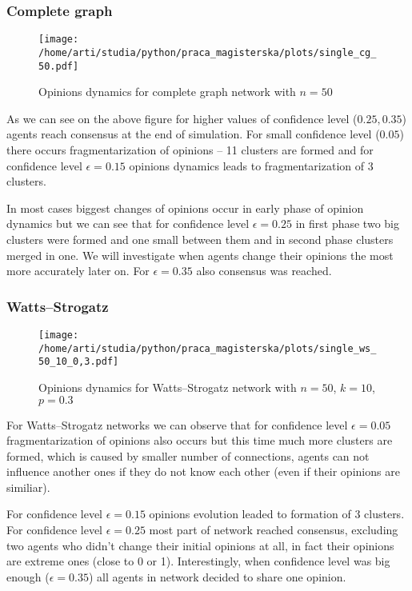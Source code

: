 \documentclass{article}
\begin{document}
\subsubsection{Complete graph}

\begin{figure}[H]
		\centering
		\texttt{[image: /home/arti/studia/python/praca\_magisterska/plots/single\_cg\_50.pdf]}
		\caption{Opinions dynamics for complete graph network with $n=50$}
\end{figure}
As we can see on the above figure for higher values of confidence level ($0.25, 0.35$) agents reach consensus at the end of simulation. For small confidence level ($0.05$) there occurs fragmentarization of opinions -- 11 clusters are formed and for confidence level $\epsilon=0.15$ opinions dynamics leads to fragmentarization of 3 clusters.
\indent

In most cases biggest changes of opinions occur in early phase of opinion dynamics but we can see that for confidence level $\epsilon=0.25$ in first phase two big clusters were formed and one small between them and in second phase clusters merged in one. We will investigate when agents change their opinions the most more accurately later on. For $\epsilon=0.35$ also consensus was reached.

\subsubsection{Watts--Strogatz}

\begin{figure}[H]
		\centering
		\texttt{[image: /home/arti/studia/python/praca\_magisterska/plots/single\_ws\_50\_10\_0,3.pdf]}
		\caption{Opinions dynamics for Watts--Strogatz network with $n=50$, $k=10$, $p=0.3$}
\end{figure}
For Watts--Strogatz networks we can observe that for confidence level $\epsilon=0.05$ fragmentarization of opinions also occurs but this time much more clusters are formed, which is caused by smaller number of connections, agents can not influence another ones if they do not know each other (even if their opinions are similiar). 
\indent

For confidence level $\epsilon=0.15$ opinions evolution leaded to formation of 3 clusters. For confidence level $\epsilon=0.25$ most part of network reached consensus, excluding two agents who didn't change their initial opinions at all, in fact their opinions are extreme ones (close to 0 or 1). Interestingly, when confidence level was big enough ($\epsilon=0.35$) all agents in network decided to share one opinion.
\indent
\end{document}
